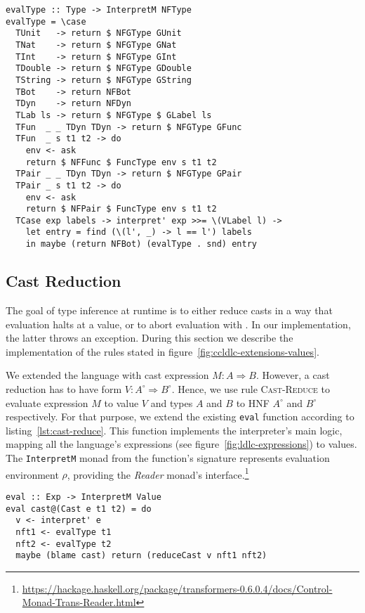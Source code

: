 \begin{lstlisting}[float,
  caption=Type evaluation (\texttt{Interpreter.hs}),
  label=lst:type-eval]
evalType :: Type -> InterpretM NFType
evalType = \case
  TUnit   -> return $ NFGType GUnit
  TNat    -> return $ NFGType GNat
  TInt    -> return $ NFGType GInt
  TDouble -> return $ NFGType GDouble
  TString -> return $ NFGType GString
  TBot    -> return NFBot
  TDyn    -> return NFDyn
  TLab ls -> return $ NFGType $ GLabel ls
  TFun  _ _ TDyn TDyn -> return $ NFGType GFunc
  TFun  _ s t1 t2 -> do
    env <- ask
    return $ NFFunc $ FuncType env s t1 t2
  TPair _ _ TDyn TDyn -> return $ NFGType GPair
  TPair _ s t1 t2 -> do
    env <- ask
    return $ NFPair $ FuncType env s t1 t2
  TCase exp labels -> interpret' exp >>= \(VLabel l) ->
    let entry = find (\(l', _) -> l == l') labels
    in maybe (return NFBot) (evalType . snd) entry
\end{lstlisting}

\subsection{Cast Reduction}

The goal of type inference at runtime is to either reduce casts in a way that evaluation halts at a value, or to abort evaluation with \blame. In our implementation, the latter throws an exception. During this section we describe the implementation of the rules stated in figure~\ref{fig:ccldlc-extensions-values}.

We extended the language with cast expression $M : A \Rightarrow B$. However, a cast reduction has to have form $V : A^\circ \Rightarrow B^\circ$. Hence, we use rule \textsc{Cast-Reduce} to evaluate expression $M$ to value $V$ and types $A$ and $B$ to HNF $A^\circ$ and $B^\circ$ respectively. For that purpose, we extend the existing \texttt{eval} function according to listing~\ref{lst:cast-reduce}. This function implements the interpreter's main logic, mapping all the language's expressions (see figure~\ref{fig:ldlc-expressions}) to values. The \texttt{InterpretM} monad from the function's signature represents evaluation environment $\rho$, providing the \emph{Reader} monad's interface.\footnote{\url{https://hackage.haskell.org/package/transformers-0.6.0.4/docs/Control-Monad-Trans-Reader.html}}

\begin{lstlisting}[float,
  caption=Cast expression evaluation (\texttt{Interpreter.hs}),
  label=lst:cast-reduce]
eval :: Exp -> InterpretM Value
eval cast@(Cast e t1 t2) = do
  v <- interpret' e
  nft1 <- evalType t1
  nft2 <- evalType t2
  maybe (blame cast) return (reduceCast v nft1 nft2)
\end{lstlisting}

